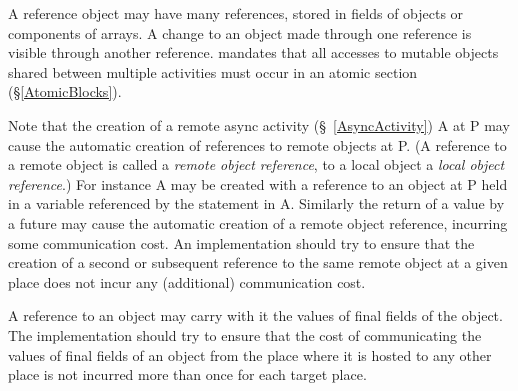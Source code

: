 A reference object may have many references, stored in fields of
objects or components of arrays. A change to an object made through
one reference is visible through another reference. \Xten{} mandates
that all accesses to mutable objects shared between multiple
activities must occur in an atomic section (\S\ref{AtomicBlocks}).

\cbstart 
Note that the creation of a remote async activity
(\S~\ref{AsyncActivity}) {\cf A} at {\cf P} may cause the automatic creation of
references to remote objects at {\cf P}. (A reference to a remote
object is called a {\em remote object reference}, to a local object a
{\em local object reference}.)  For instance {\cf A} may be created
with a reference to an object at {\cf P} held in a variable referenced
by the statement in {\cf A}.  Similarly the return of a value by a
{\cf future} may cause the automatic creation of a remote object
reference, incurring some communication cost.  An {}\Xten{}
implementation should try to ensure that the creation of a second or
subsequent reference to the same remote object at a given place does
not incur any (additional) communication cost.

\cbend 

A reference to an object may carry with it the values of final fields
of the object. The implementation should try to ensure that the cost
of communicating the values of final fields of an object from the
place where it is hosted to any other place is not incurred more than
once for each target place.

